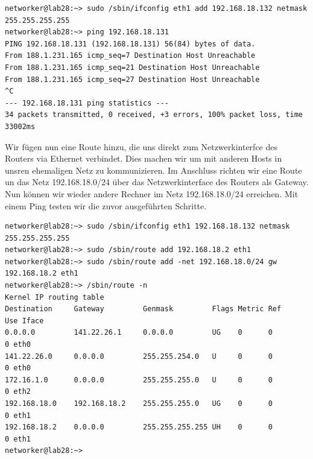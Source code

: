 \begin{lstlisting}[label=minSubnetz,caption=Minimale Subnetzmaske und Versuch zu pingen]
networker@lab28:~> sudo /sbin/ifconfig eth1 add 192.168.18.132 netmask 255.255.255.255
networker@lab28:~> ping 192.168.18.131
PING 192.168.18.131 (192.168.18.131) 56(84) bytes of data.
From 188.1.231.165 icmp_seq=7 Destination Host Unreachable
From 188.1.231.165 icmp_seq=21 Destination Host Unreachable
From 188.1.231.165 icmp_seq=27 Destination Host Unreachable
^C
--- 192.168.18.131 ping statistics ---
34 packets transmitted, 0 received, +3 errors, 100% packet loss, time 33002ms
\end{lstlisting}
Wir fügen nun eine Route hinzu, die uns direkt zum Netzwerkinterfce des Routers via Ethernet verbindet. Dies machen wir um mit anderen Hosts in unsren ehemaligen Netz zu kommunizieren. Im Anschluss richten wir eine Route un das Netz 192.168.18.0/24 über das Netzwerkinterface des Routers als Gateway. Nun können wir wieder andere Rechner im Netz 192.168.18.0/24 erreichen. Mit einem Ping testen wir die zuvor ausgeführten Schritte.
\begin{lstlisting}[label=zurueckNetz,caption=Setzen der neuen Subnetzmaske]
networker@lab28:~> sudo /sbin/ifconfig eth1 192.168.18.132 netmask 255.255.255.255
networker@lab28:~> sudo /sbin/route add 192.168.18.2 eth1
networker@lab28:~> sudo /sbin/route add -net 192.168.18.0/24 gw 192.168.18.2 eth1
networker@lab28:~> /sbin/route -n
Kernel IP routing table
Destination     Gateway         Genmask         Flags Metric Ref    Use Iface
0.0.0.0         141.22.26.1     0.0.0.0         UG    0      0        0 eth0
141.22.26.0     0.0.0.0         255.255.254.0   U     0      0        0 eth0
172.16.1.0      0.0.0.0         255.255.255.0   U     0      0        0 eth2
192.168.18.0    192.168.18.2    255.255.255.0   UG    0      0        0 eth1
192.168.18.2    0.0.0.0         255.255.255.255 UH    0      0        0 eth1
networker@lab28:~>
\end{lstlisting}
\newpage
